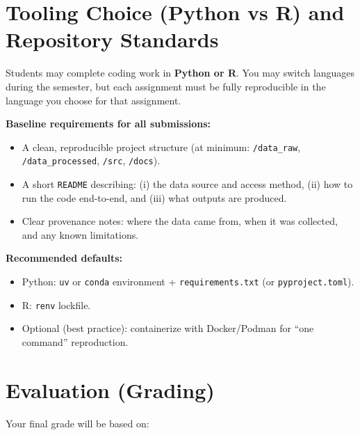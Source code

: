 \documentclass[letterpaper,11pt]{article}
\newcommand{\compresslist}{
\setlength{\itemsep}{1pt}
\setlength{\parskip}{0pt}
\setlength{\parsep}{0pt}
}
\begin{document}
\section*{Tooling Choice (Python vs R) and Repository Standards}
Students may complete coding work in \textbf{Python or R}. You may switch languages during the semester, but each assignment must be fully reproducible in the language you choose for that assignment.

\medskip
\noindent \textbf{Baseline requirements for all submissions:}
\begin{itemize}\compresslist
\item A clean, reproducible project structure (at minimum: \texttt{/data\_raw}, \texttt{/data\_processed}, \texttt{/src}, \texttt{/docs}).
\item A short \texttt{README} describing: (i) the data source and access method, (ii) how to run the code end-to-end, and (iii) what outputs are produced.
\item Clear provenance notes: where the data came from, when it was collected, and any known limitations.
\end{itemize}

\medskip
\noindent \textbf{Recommended defaults:}
\begin{itemize}\compresslist
\item Python: \texttt{uv} or \texttt{conda} environment + \texttt{requirements.txt} (or \texttt{pyproject.toml}).
\item R: \texttt{renv} lockfile.
\item Optional (best practice): containerize with Docker/Podman for ``one command'' reproduction.
\end{itemize}

\section*{Evaluation (Grading)}
Your final grade will be based on:
\end{document}
